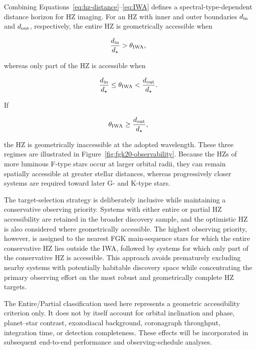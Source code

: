 Combining Equations~\ref{eq:hz-distance}--\ref{eq:IWA} defines a
spectral-type-dependent distance horizon for HZ imaging. For an HZ with inner
and outer boundaries $d_{\rm in}$ and $d_{\rm out}$, respectively, the entire HZ
is geometrically accessible when

\begin{equation}
\frac{d_{\rm in}}{d_\star}
>
\theta_{\rm IWA},
\label{eq:entire-hz}
\end{equation}

\noindent
whereas only part of the HZ is accessible when

\begin{equation}
\frac{d_{\rm in}}{d_\star}
\leq
\theta_{\rm IWA}
<
\frac{d_{\rm out}}{d_\star}.
\label{eq:partial-hz}
\end{equation}

\noindent
If

\begin{equation}
\theta_{\rm IWA}
\geq
\frac{d_{\rm out}}{d_\star},
\label{eq:unobservable-hz}
\end{equation}

\noindent
the HZ is geometrically inaccessible at the adopted wavelength. These three
regimes are illustrated in Figure~\ref{fig:fgk20-observability}. Because the HZs
of more luminous F-type stars occur at larger orbital radii, they can remain
spatially accessible at greater stellar distances, whereas progressively closer
systems are required toward later G- and K-type stars.

The target-selection strategy is deliberately inclusive while maintaining a
conservative observing priority. Systems with either entire or partial HZ
accessibility are retained in the broader discovery sample, and the optimistic
HZ is also considered where geometrically accessible. The highest observing
priority, however, is assigned to the nearest FGK main-sequence stars for which
the entire conservative HZ lies outside the IWA, followed by systems for which
only part of the conservative HZ is accessible. This approach avoids prematurely
excluding nearby systems with potentially habitable discovery space while
concentrating the primary observing effort on the most robust and geometrically
complete HZ targets.

The Entire/Partial classification used here represents a geometric accessibility
criterion only. It does not by itself account for orbital inclination and phase,
planet--star contrast, exozodiacal background, coronagraph throughput, integration
time, or detection completeness. These effects will be incorporated in subsequent
end-to-end performance and observing-schedule analyses.


